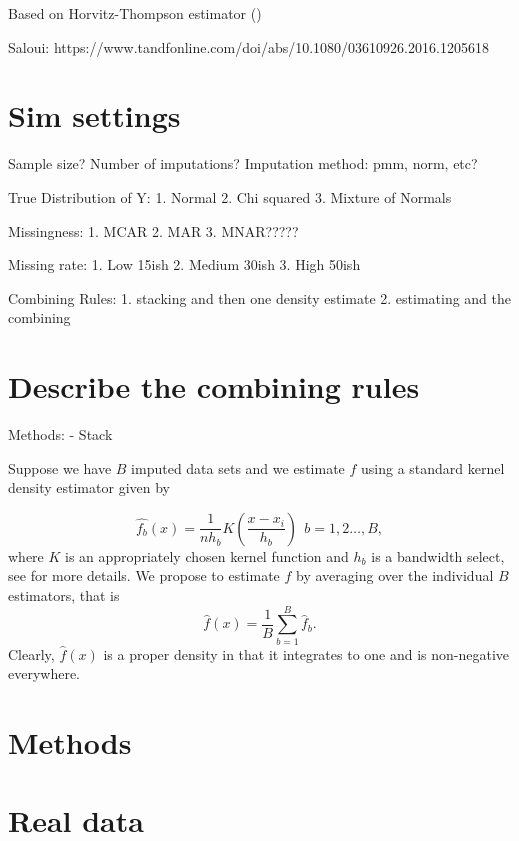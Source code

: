 \documentclass[
  12pt]{article}
\begin{document}
\citet{ElmoreEtAl2006} \citet{Dubnicka2009} Based on Horvitz-Thompson
estimator (\citet{HorvitzThompson1952})

Saloui:
https://www.tandfonline.com/doi/abs/10.1080/03610926.2016.1205618

\section{Sim settings}\label{sec-sim}

Sample size? Number of imputations? Imputation method: pmm, norm, etc?

True Distribution of Y: 1. Normal 2. Chi squared 3. Mixture of Normals

Missingness: 1. MCAR 2. MAR 3. MNAR?????

Missing rate: 1. Low 15ish 2. Medium 30ish 3. High 50ish

Combining Rules: 1. stacking and then one density estimate 2. estimating
and the combining

\section{Describe the combining
rules}\label{describe-the-combining-rules}

Methods: - Stack

Suppose we have \(B\) imputed data sets and we estimate \(f\) using a
standard kernel density estimator given by

\begin{equation}
\label{eqn:kde}
\hat{f_b}(x) = \frac1{nh_b}K\left(\frac{x - x_i}{h_b}\right) \ \ b = 1, 2 \dots, B, 
\end{equation} where \(K\) is an appropriately chosen kernel function
and \(h_b\) is a bandwidth select, see \citet{simonoff2012smoothing} for
more details. We propose to estimate \(f\) by averaging over the
individual \(B\) estimators, that is \begin{equation}
\label{eqn:kde_combo}
\hat{f}(x) = \frac1B\sum_{b=1}^B\hat{f}_b.
\end{equation} Clearly, \(\hat{f}(x)\) is a proper density in that it
integrates to one and is non-negative everywhere.

\section{Methods}\label{sec-meth}

\section{Real data}\label{real-data}
\end{document}

